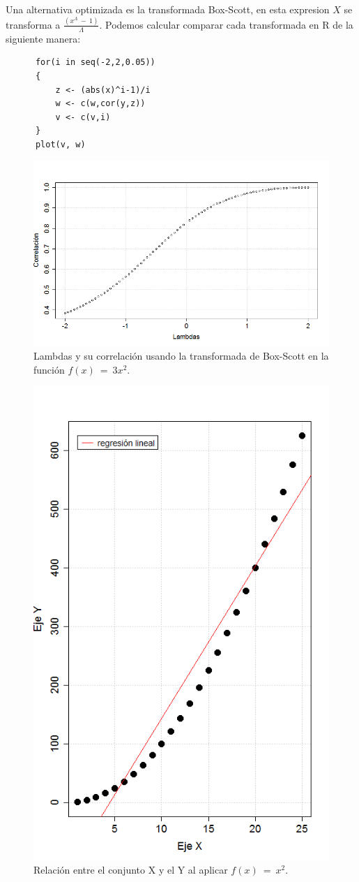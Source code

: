 \documentclass[]{article}
\begin{document}
\begin{figure}[hbt!]
\label{fig:casos}
\end{figure}


Una alternativa optimizada es la transformada Box-Scott, en esta expresion $X$ se transforma a $\frac{(x^{\Lambda }\ -\ 1)}{\Lambda }$.
Podemos calcular comparar cada transformada en R de la siguiente manera:
  \begin{lstlisting}
      for(i in seq(-2,2,0.05))
      {
          z <- (abs(x)^i-1)/i
          w <- c(w,cor(y,z))
          v <- c(v,i)
      }
      plot(v, w)
   \end{lstlisting}

\begin{figure}[hbt!] 
\centering \includegraphics[width=.7\linewidth]{Figuras/box-cox.png}                 \caption{Lambdas y su correlación usando la transformada de Box-Scott en la función $f\left(x\right)\ =\ 3x^2$.}
\label{fig:Correlacionbox}
\end{figure}

\begin{figure}[bt!]
\centering \includegraphics[width=.7\linewidth]{Figuras/CorrelacionCurva.png}                 \caption{Relación entre el conjunto X y el Y al aplicar $f\left(x\right)\ =\ x^2$.}
\label{fig:Curva}
\end{figure}




\printbibliography[title={Referencias}]
\end{document}
